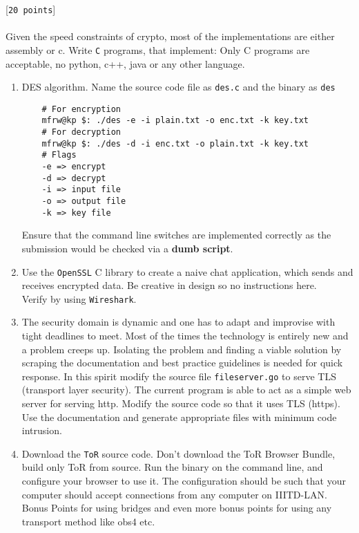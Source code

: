 \documentclass[11pt]{article}
\begin{document}
 [\texttt{20 points}] \\\\
Given the speed constraints of crypto, most of the implementations are either assembly or c. Write \texttt{C} programs, that implement:
Only C programs are acceptable, no python, c++, java or any other language.
\begin{enumerate}
    \item {
    DES algorithm. Name the source code file as \texttt{des.c} and the binary as \texttt{des}
    \begin{verbatim}
    # For encryption
    mfrw@kp $: ./des -e -i plain.txt -o enc.txt -k key.txt 
    # For decryption
    mfrw@kp $: ./des -d -i enc.txt -o plain.txt -k key.txt
    # Flags
    -e => encrypt
    -d => decrypt
    -i => input file
    -o => output file
    -k => key file
    \end{verbatim}
    Ensure that the command line switches are implemented correctly as the submission would be checked via a \textbf{dumb script}.
    }
    
    \item {
    Use the \texttt{OpenSSL} C library to create a naive chat application, which sends and receives encrypted data. Be creative in design so no instructions here.\\
    Verify by using \texttt{Wireshark}.
    }
    
    \item {
    The security domain is dynamic and one has to adapt and improvise with tight deadlines to meet. Most of the times the technology is entirely new and a problem creeps up. Isolating the problem and finding a viable solution by scraping the documentation and best practice guidelines is needed for quick response. In this spirit modify the source file \texttt{fileserver.go} to serve TLS (transport layer security). The current program is able to act as a simple web server for serving http. Modify the source code so that it uses TLS (https). Use the documentation and generate appropriate files with minimum code intrusion.
    }
    
    \item {
    Download the \texttt{ToR} source code. Don't download the ToR Browser Bundle, build only ToR from source. Run the binary on the command line, and configure your browser to use it. The configuration should be such that your computer should accept connections from any computer on IIITD-LAN. Bonus Points for using bridges and even more bonus points for using any transport method like obs4 etc.
    }
    

\end{enumerate}
\end{document}
